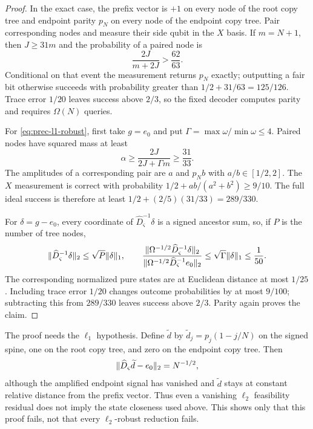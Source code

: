 \begin{proof}
In the exact case, the prefix vector is $+1$ on every node of the root copy
tree and endpoint parity $p_N$ on every node of the endpoint copy tree.  Pair
corresponding nodes and measure their side qubit in the $X$ basis.  If
$m=N+1$, then $J\geq31m$ and the probability of a paired node is
\begin{equation}
 \frac{2J}{m+2J}>\frac{62}{63}.                           \label{eq:prec-copy-mass}
\end{equation}
Conditional on that event the measurement returns $p_N$ exactly; outputting a
fair bit otherwise succeeds with probability greater than
$1/2+31/63=125/126$.  Trace error $1/20$ leaves success above $2/3$, so the
fixed decoder computes parity and requires $\Omega(N)$ queries.

For \eqref{eq:prec-l1-robust}, first take $g=e_0$ and put
$\Gamma=\max\omega/\min\omega\leq4$.  Paired nodes have squared mass at
least
\[
 \alpha\geq\frac{2J}{2J+\Gamma m}\geq\frac{31}{33}.
\]
The amplitudes of a corresponding pair are $a$ and $p_Nb$ with
$a/b\in[1/2,2]$.  The $X$ measurement is correct with probability
$1/2+ab/(a^2+b^2)\geq9/10$.  The full ideal success is therefore at least
$1/2+(2/5)(31/33)=289/330$.

For $\delta=g-e_0$, every coordinate of
$\widehat D_\varsigma^{-1}\delta$ is a signed ancestor sum, so, if $P$ is
the number of tree nodes,
\[
 \lVert\widehat D_\varsigma^{-1}\delta\rVert_2
 \leq\sqrt P\lVert\delta\rVert_1,
 \qquad
 \frac{\lVert\Omega^{-1/2}\widehat D_\varsigma^{-1}\delta\rVert_2}
 {\lVert\Omega^{-1/2}\widehat D_\varsigma^{-1}e_0\rVert_2}
 \leq\sqrt\Gamma\lVert\delta\rVert_1\leq\frac1{50}.
\]
The corresponding normalized pure states are at Euclidean distance at most
$1/25$.  Including trace error $1/20$ changes outcome probabilities by at
most $9/100$; subtracting this from $289/330$ leaves success above $2/3$.
Parity again proves the claim.
\end{proof}

The proof needs the $\ell_1$ hypothesis.  Define $\widetilde d$ by
$\widetilde d_j=p_j(1-j/N)$ on the signed spine, one on the root copy tree,
and zero on the endpoint copy tree.  Then
\begin{equation}
 \lVert\widehat D_\varsigma\widetilde d-e_0\rVert_2=N^{-1/2},  \label{eq:prec-l2-failure}
\end{equation}
although the amplified endpoint signal has vanished and $\widetilde d$ stays
at constant relative distance from the prefix vector.  Thus even a vanishing
$\ell_2$ feasibility residual does not imply the state closeness used above.
This shows only that this proof fails, not that every $\ell_2$-robust
reduction fails.

